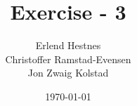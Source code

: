 \newcommand{\mytitle}{Exercise - 3}
\newcommand{\mygroupnumber}{4}
\newcommand{\myauthor}{Erlend Hestnes\\Christoffer Ramstad-Evensen\\Jon Zwaig Kolstad}

\title{\mytitle}
\author{\myauthor}
\date{\today}
